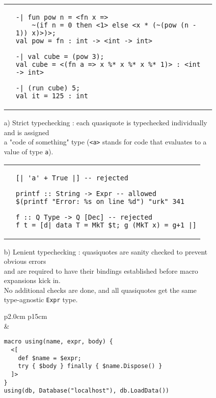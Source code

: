\documentclass[10pt,journal,a4paper]{IEEEtran}
\begin{document}
\begin{figure*}[t]
\begin{listing}
\normalsize

\begin{tabular}{p{2.0cm} p{15cm}}\\
 &
\begin{verbatim}
-| fun pow n = <fn x =>
    ~(if n = 0 then <1> else <x * (~(pow (n - 1)) x)>)>;
val pow = fn : int -> <int -> int>

-| val cube = (pow 3);
val cube = <(fn a => x %* x %* x %* 1)> : <int -> int>

-| (run cube) 5;
val it = 125 : int
\end{verbatim}
\end{tabular}

\begin{adjustwidth}{2.5cm}{0pt}
a) Strict typechecking \cite{taha99}: each quasiquote is typechecked individually and is assigned\\
a "code of something" type (\small \texttt{<a>} \normalsize stands for code that evaluates to a
value of type \small \texttt{a})\normalsize.\\
\end{adjustwidth}

\begin{tabular}{p{2.0cm} p{15cm}}\\
 &
\begin{verbatim}
[| 'a' + True |] -- rejected

printf :: String -> Expr -- allowed
$(printf "Error: %s on line %d") "urk" 341

f :: Q Type -> Q [Dec] -- rejected
f t = [d| data T = MkT $t; g (MkT x) = g+1 |]
\end{verbatim}
\end{tabular}

\begin{adjustwidth}{2.5cm}{0pt}
b) Lenient typechecking \cite{sheard02}: quasiquotes are sanity checked to prevent obvious errors\\
and are required to have their bindings established before macro expansions kick in.\\
No additional checks are done, and all quasiquotes get the same type-agnostic
\small \texttt{Expr} \normalsize type.
\end{adjustwidth}

\begin{tabular}{p{2.0cm} p{15cm}}\\
 &
\begin{verbatim}
macro using(name, expr, body) {
  <[
    def $name = $expr;
    try { $body } finally { $name.Dispose() }
  ]>
}
using(db, Database("localhost"), db.LoadData())
\end{verbatim}
\end{tabular}


\end{listing}
\end{figure*}
\end{document}
